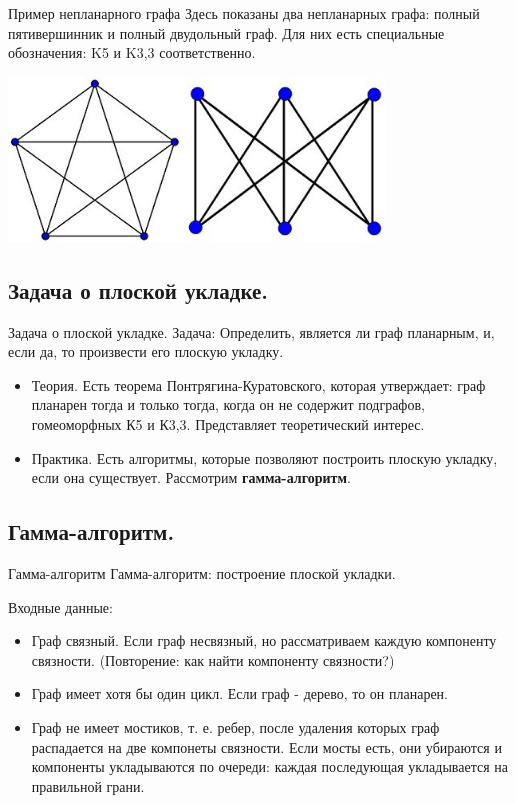 \documentclass[10pt]{beamer}
\begin{document}
\begin{frame}[fragile]{Пример непланарного графа}
Здесь показаны два непланарных графа: полный пятивершинник и полный двудольный граф. Для них есть специальные обозначения: K5 и K3,3 соответственно.
\begin{center}
    \includegraphics[width=10cm]{Term_2/Source/images/4_k33_k5.jpeg}
\end{center}
\end{frame}

\subsection{Задача о плоской укладке.}

\begin{frame}[fragile]{Задача о плоской укладке.}
Задача: Определить, является ли граф планарным, и, если да, то произвести его плоскую укладку.
    \begin{itemize}
        \item Теория. Есть теорема Понтрягина-Куратовского, которая утверждает: граф планарен тогда и только тогда, когда он не содержит подграфов, гомеоморфных К5 и К3,3. Представляет теоретический интерес.
        \item Практика. Есть алгоритмы, которые позволяют построить плоскую укладку, если она существует. Рассмотрим \textbf{гамма-алгоритм}.
    \end{itemize}
    
\end{frame}

\subsection{Гамма-алгоритм.}

\begin{frame}[fragile]{Гамма-алгоритм}
Гамма-алгоритм: построение плоской укладки.

Входные данные:
    \begin{itemize}
        \item Граф связный. Если граф несвязный, но рассматриваем каждую компоненту связности. (Повторение: как найти компоненту связности?)
        \item Граф имеет хотя бы один цикл. Если граф - дерево, то он планарен.
        \item Граф не имеет мостиков, т. е. ребер, после удаления которых граф распадается на две компонеты связности. Если мосты есть, они убираются и компоненты укладываются по очереди: каждая последующая укладывается на правильной грани.
    \end{itemize}
    
\end{frame}
\end{document}
